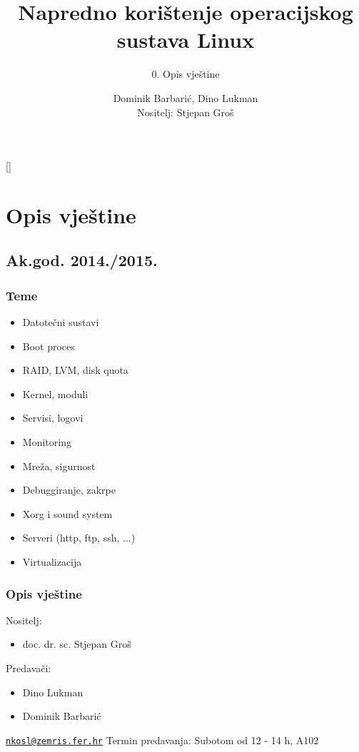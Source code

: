 \documentclass[t]{beamer}
\date{}
\title[NKOSL]{Napredno korištenje operacijskog sustava Linux}
\author[]{Dominik Barbarić, Dino Lukman\\{\small Nositelj: Stjepan Groš}}
\subtitle{0. Opis vještine}
\institute[]{Sveučilište u Zagrebu\\Fakultet elektrotehnike i računarstva}
\begin{document}
{
	\begin{frame}
		\maketitle
	\end{frame}
}

\section{Opis vještine}
\subsection{Ak.god. 2014./2015.}

\begin{frame}
	\frametitle{Teme}
	\begin{itemize}
		\item Datotečni sustavi
		\item Boot proces
		\item RAID, LVM, disk quota
		\item Kernel, moduli
		\item Servisi, logovi
		\item Monitoring
		\item Mreža, sigurnost
		\item Debuggiranje, zakrpe
		\item Xorg i sound system
		\item Serveri (http, ftp, ssh, ...)
		\item Virtualizacija
	\end{itemize}
\end{frame}

\begin{frame}
	\frametitle{Opis vještine}
	Nositelj:
	\begin{itemize}
		\item[] doc. dr. sc. Stjepan Groš
	\end{itemize}
	Predavači:
	\begin{itemize}
		\item Dino Lukman
		\item Dominik Barbarić
	\end{itemize}
	\vfill
	\href{mailto:nkosl@zemris.fer.hr}{\nolinkurl{nkosl@zemris.fer.hr}}
	\vfill
	Termin predavanja: Subotom od 12 - 14 h, A102
\end{frame}
\end{document}
